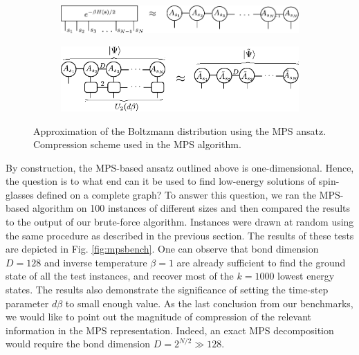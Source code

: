 \begin{figure}
  \begin{subfigure}[t]{0.45\textwidth}
    \caption{}\label{fig:mps:boltzmann}
    \includegraphics[width=\textwidth]{figures/mps}
  \end{subfigure}\hfill
  \begin{subfigure}[t]{0.45\textwidth}
    \caption{}\label{fig:mps:compress}
    \includegraphics[width=\textwidth]{figures/mps_compress}
  \end{subfigure}
  \caption{ Approximation of the Boltzmann distribution using the MPS ansatz.  Compression scheme used in the MPS algorithm.}
  \label{fig:mps}
\end{figure}

By construction, the MPS-based ansatz outlined above is one-dimensional. Hence,
the question is to what end can it be used to find low-energy solutions of
spin-glasses defined on a complete graph? To answer this question, we ran the
MPS-based algorithm on 100 instances of different sizes and then compared the
results to the output of our brute-force algorithm. Instances were drawn at
random using the same procedure as described in the previous section. The
results of these tests are depicted in Fig. \ref{fig:mpsbench}. One can observe
that bond dimension $D=128$ and inverse temperature $\beta=1$ are already
sufficient to find the ground state of all the test instances, and recover most
of the $k=1000$ lowest energy states. The results also demonstrate the
significance of setting the time-step parameter $d\beta$ to small enough value.
As the last conclusion from our benchmarks, we would like to point out the
magnitude of compression of the relevant information in the MPS representation.
Indeed, an exact MPS decomposition would require the bond dimension $D=2^{N/2}
\gg 128$.

